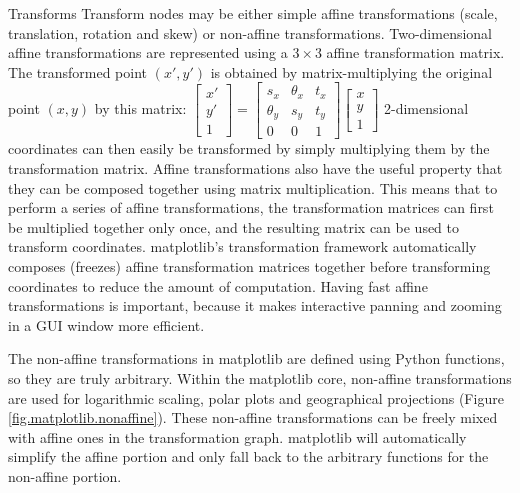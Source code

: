 \begin{aosasect1}{Transforms}
Transform nodes may be either simple affine transformations (scale,
translation, rotation and skew) or non-affine transformations.
Two-dimensional affine transformations are represented using a $3
\times 3$ affine transformation matrix.  The transformed point
$(x\prime, y\prime)$ is obtained by matrix-multiplying the original
point $(x, y)$ by this matrix:
\begin{math}
\begin{bmatrix} x' \\ y' \\ 1 \end{bmatrix} = \begin{bmatrix} s_x & \theta_x & t_x \\ \theta_y & s_y & t_y \\ 0 & 0 & 1 \end{bmatrix} \begin{bmatrix} x \\ y \\ 1 \end{bmatrix}
\end{math}
2-dimensional coordinates can then easily be transformed by simply
multiplying them by the transformation matrix.  Affine transformations
also have the useful property that they can be composed together using
matrix multiplication.  This means that to perform a series of affine
transformations, the transformation matrices can first be multiplied
together only once, and the resulting matrix can be used to transform
coordinates.  matplotlib's transformation framework automatically
composes (freezes) affine transformation matrices together before
transforming coordinates to reduce the amount of computation.  Having
fast affine transformations is important, because it makes interactive
panning and zooming in a GUI window more efficient.

The non-affine transformations in matplotlib are defined using Python
functions, so they are truly arbitrary.  Within the matplotlib core,
non-affine transformations are used for logarithmic scaling, polar
plots and geographical projections (Figure
\ref{fig.matplotlib.nonaffine}).  These non-affine transformations can
be freely mixed with affine ones in the transformation graph.
matplotlib will automatically simplify the affine portion and only
fall back to the arbitrary functions for the non-affine portion.



\end{aosasect1}
